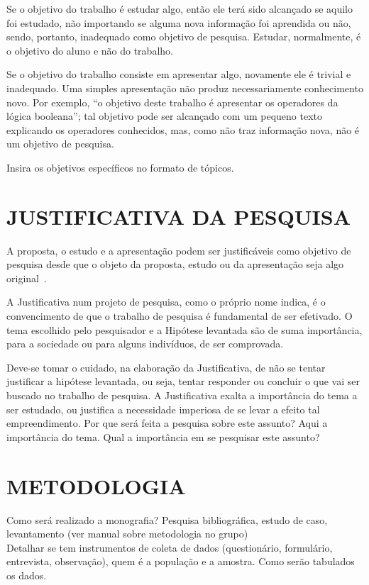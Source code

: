 \documentclass[
    12pt,				       %
    openright,			       %
    oneside,			       %
    a4paper,			       %
    chapter=TITLE,             %
    sumario=tradicional,       %
    english,			        %
    brazil, 				    %
 ]{abntex2}
\begin{document}
Se o objetivo do trabalho é estudar algo, então ele terá sido alcançado se aquilo foi estudado, não importando se alguma nova informação foi aprendida ou não, sendo, portanto, inadequado como objetivo de pesquisa. Estudar, normalmente, é o objetivo do aluno e não do trabalho.

Se o objetivo do trabalho consiste em apresentar algo, novamente ele é trivial e inadequado. Uma simples apresentação não produz necessariamente conhecimento novo. Por exemplo, “o objetivo deste trabalho é apresentar os operadores da lógica booleana”; tal objetivo pode ser alcançado com um pequeno texto explicando os operadores conhecidos, mas, como não traz informação nova, não é um objetivo de pesquisa.

Insira os objetivos específicos no formato de tópicos.

\section{\MakeUppercase{Justificativa da Pesquisa}}\label{sec:Justificativa}

A proposta, o estudo e a apresentação podem ser justificáveis como objetivo de pesquisa desde que o objeto da proposta, estudo ou da apresentação seja algo original~\cite{wazlawick2009}.

A Justificativa num projeto de pesquisa, como o próprio nome indica, é o convencimento de que o trabalho de pesquisa é fundamental de ser efetivado. O tema escolhido pelo pesquisador e a Hipótese levantada são de suma importância, para a sociedade ou para alguns indivíduos, de ser comprovada.

Deve-se tomar o cuidado, na elaboração da Justificativa, de não se tentar justificar a hipótese levantada, ou seja, tentar responder ou concluir o que vai ser buscado no trabalho de pesquisa. A Justificativa exalta a importância do tema a ser estudado, ou justifica a necessidade imperiosa de se levar a efeito tal empreendimento.
Por que será feita a pesquisa sobre este assunto? Aqui a importância do tema. Qual a importância em se pesquisar este assunto?


\section{\MakeUppercase{Metodologia}}\label{sec:Metodologia}

Como será realizado a monografia? Pesquisa bibliográfica, estudo de caso, levantamento (ver manual sobre metodologia no grupo) \\
Detalhar se tem instrumentos de coleta de dados (questionário, formulário, entrevista, observação), quem é a população e a amostra. Como serão tabulados os dados.
\end{document}
